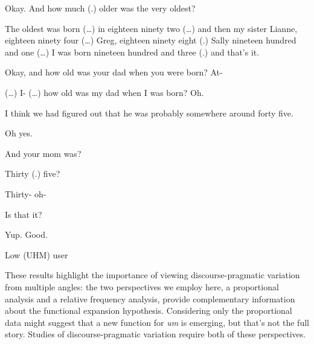 \documentclass[11pt]{article}
\begin{document}
\begin{extract}[ht!]
    \begin{mdframed}[leftmargin=10pt,rightmargin=10pt]
        \begin{dialogue}

             Okay. And how much (.) older was the very oldest?

             The oldest was born (\ldots) in eighteen ninety two
            (\ldots) and then my sister Lianne, eighteen ninety four (\ldots)
            Greg, eighteen ninety eight (.) Sally nineteen hundred and one
            (\ldots) I was born nineteen hundred and three (.) and that's it.

             Okay, and how old was your dad when you were born? At-

             (\ldots) I- (\ldots) how old was my dad when I was born? Oh.

             I think we had figured out that he was probably
            somewhere around forty five.

             Oh yes.

             And your mom was?

             Thirty (.) five?

             Thirty- oh-

             Is that it?

             Yup. Good.

        \end{dialogue}
    \end{mdframed}
    \caption{Low (UHM) user}\label{ext:lowuhm}
\end{extract}

These results highlight the importance of viewing discourse-pragmatic variation
from multiple angles:
the two perspectives we employ here, a proportional analysis and a relative
frequency analysis, provide complementary information about the functional
expansion hypothesis.
Considering only the proportional data might suggest that a new function for
\emph{um} is emerging, but that's not the full story.
Studies of discourse-pragmatic variation require both of these perspectives.

\printbibliography
\end{document}
